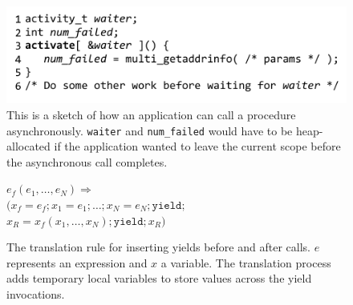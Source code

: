 \documentclass[preprint, 10pt, numbers]{sigplanconf}
\begin{document}
\begin{figure}
\includegraphics{multi_getaddrinfo_async_call}
\caption{This is a sketch of how an application can call a procedure asynchronously.
\texttt{waiter} and \texttt{num\_failed} would have to be heap-allocated if the application wanted to leave the current scope before the asynchronous call completes.}
\label{fig:charcoal_multidns_async_call}
\end{figure}

\begin{figure}
  $e_f(e_1, \ldots, e_N) \Rightarrow$ \\
  \hspace*{1em} $( x_f=e_f; x_1=e_1; \ldots; x_N=e_N; \mathtt{yield};$ \\
  \hspace*{2em} $x_R=x_f(x_1, \ldots, x_N); \mathtt{yield}; x_R )$
  \caption{The translation rule for inserting yields before and after calls.
    $e$ represents an expression and $x$ a variable.
  The translation process adds temporary local variables to store values across the yield invocations.}
    \label{fig:translation}
\end{figure}







\end{document}
